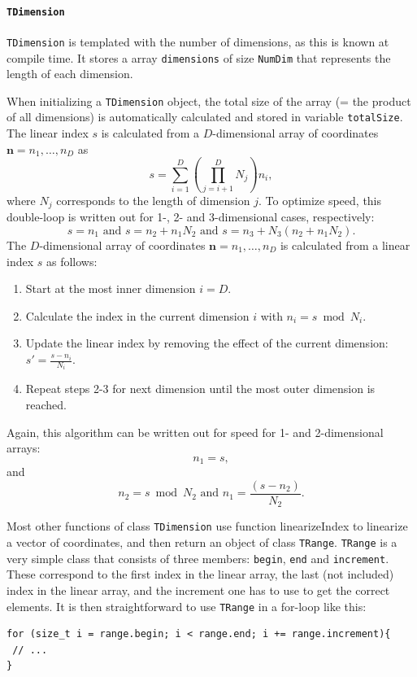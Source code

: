 \documentclass[a4paper,11pt]{article}
\newcommand{\class}[1]{\texttt{#1}}
\newcommand{\privparam}[1]{\texttt{\textunderscore #1}}
\newcommand{\pubparam}[1]{\texttt{#1}}
\newcommand{\template}[1]{\texttt{#1}}
\begin{document}
\paragraph{\class{TDimension}}

\class{TDimension} is templated with the number of dimensions, as this is known at compile time. It stores a array \privparam{dimensions} of size \template{NumDim} that represents the length of each dimension.

When initializing a \class{TDimension} object, the total size of the array (= the product of all dimensions) is automatically calculated and stored in variable \privparam{totalSize}.\\
The linear index $s$ is calculated from a $D$-dimensional array of coordinates $\boldsymbol{n} = n_1, \ldots, n_D$ as
\begin{equation}\label{eq:linearize}
 s = \sum_{i=1}^{D} \left( \prod_{j=i+1}^{D} N_j \right) n_i,
\end{equation}
where $N_j$ corresponds to the length of dimension $j$. To optimize speed, this double-loop is written out for 1-, 2- and 3-dimensional cases, respectively:
\begin{equation*}
 s = n_1 \text{ and } s = n_2 + n_1 N_2 \text{ and } s = n_3 + N_3(n_2 + n_1 N_2).
\end{equation*}
The $D$-dimensional array of coordinates $\boldsymbol{n} = n_1, \ldots, n_D$ is calculated from a linear index $s$ as follows: \label{algo:getSubscripts}
\begin{enumerate}
 \item Start at the most inner dimension $i = D$.
 \item Calculate the index in the current dimension $i$ with $n_i = s \bmod N_i$.
 \item Update the linear index by removing the effect of the current dimension: $s' = \frac{s - n_i}{N_i}$.
 \item Repeat steps 2-3 for next dimension until the most outer dimension is reached.
\end{enumerate}
Again, this algorithm can be written out for speed for 1- and 2-dimensional arrays:
\begin{equation*}
n_1 = s,
\end{equation*}
and
\begin{equation*}
 n_2 = s \bmod N_2 \text{ and } n_1 = \frac{(s - n_2)}{N_2}.
\end{equation*}

Most other functions of class \class{TDimension} use function linearizeIndex to linearize a vector of coordinates, and then return an object of class \class{TRange}. \class{TRange} is a very simple class that consists of three members: \pubparam{begin}, \pubparam{end} and \pubparam{increment}. These correspond to the first index in the linear array, the last (not included) index in the linear array, and the increment one has to use to get the correct elements. It is then straightforward to use \class{TRange} in a for-loop like this:
\begin{lstlisting}
for (size_t i = range.begin; i < range.end; i += range.increment){
 // ...
}
\end{lstlisting}
\end{document}

